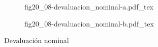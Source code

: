 \begin{figure}[h]
\captionsetup[subfigure]{aboveskip=20pt,belowskip=15pt}
\centering
\begin{subfigure}{.45\textwidth}
  \centering
        \def\svgwidth{\textwidth}
        {fig20_08-devaluacion_nominal-a.pdf_tex}
\end{subfigure}\hspace{.05\textwidth}
\begin{subfigure}{.45\textwidth}
  \centering
        \def\svgwidth{\textwidth}
        {fig20_08-devaluacion_nominal-b.pdf_tex}
\end{subfigure}
\caption{Devaluación nominal}
\label{fig20_08-devaluacion_nominal}
\end{figure}